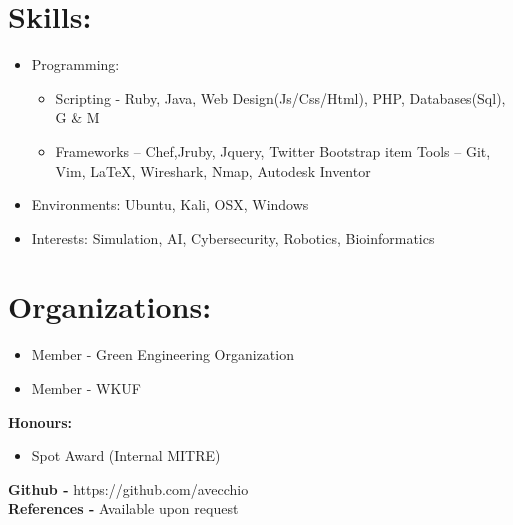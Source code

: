 \documentclass{res}
\begin{document}
\section{Skills:}
\begin{itemize}
\item Programming:
\begin{itemize}[label=$\circ$]
\item Scripting - Ruby, Java, Web Design(Js/Css/Html), PHP, Databases(Sql), G \& M
\item Frameworks – Chef,Jruby, Jquery, Twitter Bootstrap
item Tools – Git, Vim, \LaTeX, Wireshark, Nmap, Autodesk Inventor
\end{itemize}
\item Environments: Ubuntu, Kali, OSX, Windows
\item Interests: Simulation, AI, Cybersecurity, Robotics, Bioinformatics
\end{itemize}
\section{Organizations:}
\begin{itemize}
\item Member - Green Engineering Organization
\item Member - WKUF
\end{itemize}

\textbf{Honours:}
\begin{itemize}
\item Spot Award (Internal MITRE)
\end{itemize}

\begin{center}
\textbf{Github - }https://github.com/avecchio\\
\textbf{References - }Available upon request
\end{center}
\end{document}
